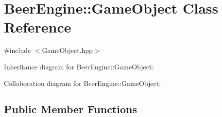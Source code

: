 \hypertarget{class_beer_engine_1_1_game_object}{}\section{Beer\+Engine\+:\+:Game\+Object Class Reference}
\label{class_beer_engine_1_1_game_object}


{\ttfamily \#include $<$Game\+Object.\+hpp$>$}



Inheritance diagram for Beer\+Engine\+:\+:Game\+Object\+:


Collaboration diagram for Beer\+Engine\+:\+:Game\+Object\+:
\subsection*{Public Member Functions}
